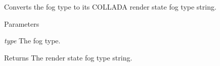 \label{namespaceFUDaePassStateFogType_a85184e44bf9a8d20b450302c50535ebd}
Converts the fog type to its COLLADA render state fog type string. 
\begin{DoxyParams}{Parameters}
\item[{\em type}]The fog type. \end{DoxyParams}
\begin{DoxyReturn}{Returns}
The render state fog type string. 
\end{DoxyReturn}
